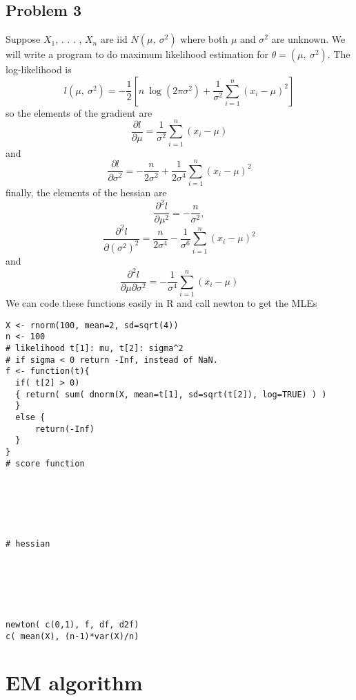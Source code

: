 \documentclass[12pt]{article}
\begin{document}
\subsection*{Problem 3}
Suppose $X_{1}$, . . . , $X_{n}$ are iid $N(\mu,\ \sigma^{2})$ where both $\mu$ and $\sigma^{2}$ are unknown. We will write a program to do maximum likelihood estimation for $\theta=(\mu,\ \sigma^{2})$. The log-likelihood is
$$
l(\mu,\ \sigma^{2})=-\frac{1}{2}[n\ \log(2\pi\sigma^{2})+\frac{1}{\sigma^{2}}\sum_{i=1}^{n}(x_{i}-\mu)^{2}]
$$
so the elements of the gradient are
$$
\frac{\partial l}{\partial\mu}=\frac{1}{\sigma^{2}}\sum_{i=1}^{n}(x_{i}-\mu)
$$
and
$$
\frac{\partial l}{\partial\sigma^{2}}=-\frac{n}{2\sigma^{2}}+\frac{1}{2\sigma^{4}}\sum_{i=1}^{n}(x_{i}-\mu)^{2}
$$
finally, the elements of the hessian are
$$
\frac{\partial^{2}l}{\partial\mu^{2}}=-\frac{n}{\sigma^{2}},
$$
$$
\frac{\partial^{2}l}{\partial(\sigma^{2})^{2}}=\frac{n}{2\sigma^{4}}-\frac{1}{\sigma^{6}}\sum_{i=1}^{n}(x_{i}-\mu)^{2}
$$
and
$$
\frac{\partial^{2}l}{\partial\mu\partial\sigma^{2}}=-\frac{1}{\sigma^{4}}\sum_{i=1}^{n}(x_{i}-\mu)
$$
We can code these functions easily in $\mathrm{R}$ and call newton to get the MLEs
\begin{verbatim}
X <- rnorm(100, mean=2, sd=sqrt(4))
n <- 100
# likelihood t[1]: mu, t[2]: sigma^2
# if sigma < 0 return -Inf, instead of NaN.
f <- function(t){
  if( t[2] > 0)
  { return( sum( dnorm(X, mean=t[1], sd=sqrt(t[2]), log=TRUE) ) )
  } 
  else {
	  return(-Inf)
  }
}
# score function






# hessian






newton( c(0,1), f, df, d2f)
c( mean(X), (n-1)*var(X)/n)
\end{verbatim}


\section{EM algorithm}
\end{document}
